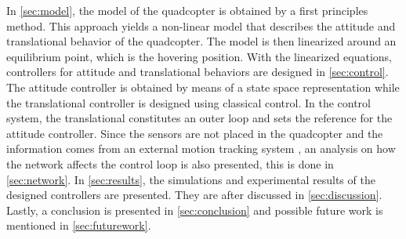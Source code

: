 In \autoref{sec:model}, the model of the quadcopter is obtained by a first principles method. This approach yields a non-linear model that describes the attitude and translational behavior of the quadcopter. The model is then linearized around an equilibrium point, which is the hovering position. 
%
With the linearized equations, controllers for attitude and translational behaviors are designed in \autoref{sec:control}. The attitude controller is obtained by means of a state space representation while the translational controller is designed using classical control. In the control system, the translational constitutes an outer loop and sets the reference for the attitude controller.
%
Since the sensors are not placed in the quadcopter and the information comes from an external motion tracking system \cite{vicon}, an analysis on how the network affects the control loop is also presented, this is done in \autoref{sec:network}.
%
In \autoref{sec:results}, the simulations and experimental results of the designed controllers are presented. They are after discussed in \autoref{sec:discussion}. Lastly, a conclusion is presented in \autoref{sec:conclusion} and possible future work is mentioned in \autoref{sec:futurework}. %